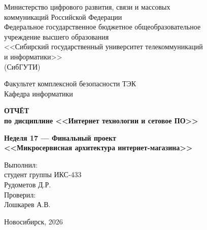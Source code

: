 \begin{titlepage}
\begin{center}

Министерство цифрового развития, связи и массовых\\
коммуникаций Российской Федерации\\[4pt]
Федеральное государственное бюджетное общеобразовательное\\
учреждение высшего образования\\[4pt]
<<Сибирский государственный университет телекоммуникаций\\
и информатики>>\\[4pt]
(СибГУТИ)
\vspace{1cm}

Факультет комплексной безопасности ТЭК\\
Кафедра информатики\\

\vspace{2cm}

\textbf{\Large ОТЧЁТ}\\
\textbf{\large по дисциплине <<Интернет технологии и сетовое ПО>>}\\

\vspace{0.5cm}

\textbf{\large Неделя 17 --- Финальный проект}\\
\textbf{\large <<Микросервисная архитектура интернет-магазина>>}

\vspace{3cm}

\end{center}

\begin{flushright}
\begin{minipage}{0.45\textwidth}
Выполнил:\\
студент группы ИКС-433\\
Рудометов Д.Р.\\
Проверил:\\
Лошкарев А.В.
\end{minipage}
\end{flushright}

\vfill

\begin{center}
Новосибирск, 2026
\end{center}

\end{titlepage}
